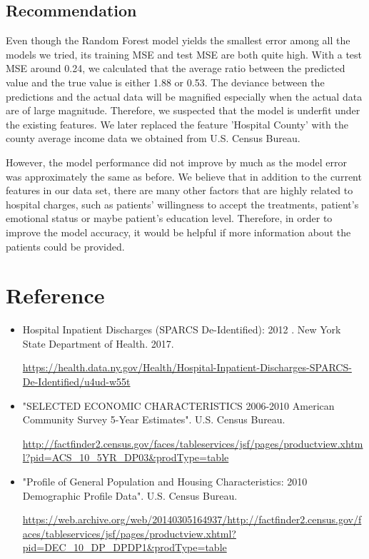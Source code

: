 \documentclass[journal, a4paper,11pt]{IEEEtran}
\begin{document}
	
\subsection{Recommendation}
	Even though the Random Forest model yields the smallest error among all the models we tried, its training MSE and test MSE are both quite high. With a test MSE around 0.24, we calculated that the average ratio between the predicted value and the true value is either 1.88 or 0.53. The deviance between the predictions and the actual data will be magnified especially when the actual data are of large magnitude. Therefore, we suspected that the model is underfit under the existing features. We later replaced the feature 'Hospital County' with the county average income data we obtained from U.S. Census Bureau.
	 	
	However, the model performance did not improve by much as the model error was approximately the same as before. We believe that in addition to the current features in our data set, there are many other factors that are highly related to hospital charges, such as patients' willingness to accept the treatments, patient's emotional status or maybe patient's education level. Therefore, in order to improve the model accuracy, it would be helpful if more information about the patients could be provided.

\section{Reference}

	\begin{itemize}
	\item Hospital Inpatient Discharges (SPARCS De-Identified): 2012
. New York State Department of Health. 2017.

	\url{https://health.data.ny.gov/Health/Hospital-Inpatient-Discharges-SPARCS-De-Identified/u4ud-w55t}
	
	
	\item "SELECTED ECONOMIC CHARACTERISTICS 2006-2010 American Community Survey 5-Year Estimates". U.S. Census Bureau.
	
	\url{http://factfinder2.census.gov/faces/tableservices/jsf/pages/productview.xhtml?pid=ACS_10_5YR_DP03&prodType=table}
	
	\item "Profile of General Population and Housing Characteristics: 2010 Demographic Profile Data". U.S. Census Bureau. 
	
	\url{https://web.archive.org/web/20140305164937/http://factfinder2.census.gov/faces/tableservices/jsf/pages/productview.xhtml?pid=DEC_10_DP_DPDP1&prodType=table}
	
	\end{itemize}

	
\end{document}
